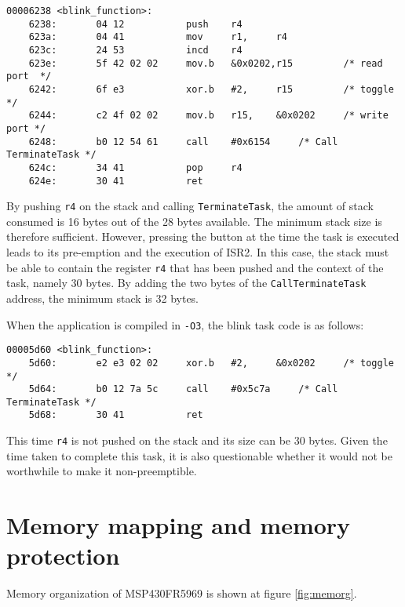 \documentclass[11pt, oneside]{article}   	%
\begin{document}
\begin{lstlisting}[basicstyle=\footnotesize\ttfamily]
00006238 <blink_function>:
    6238:       04 12           push    r4              
    623a:       04 41           mov     r1,     r4      
    623c:       24 53           incd    r4              
    623e:       5f 42 02 02     mov.b   &0x0202,r15         /* read port  */
    6242:       6f e3           xor.b   #2,     r15         /* toggle     */
    6244:       c2 4f 02 02     mov.b   r15,    &0x0202     /* write port */
    6248:       b0 12 54 61     call    #0x6154     /* Call TerminateTask */
    624c:       34 41           pop     r4              
    624e:       30 41           ret                     
\end{lstlisting}

By pushing \lstinline{r4} on the stack and calling \lstinline{TerminateTask}, the amount of stack consumed is 16 bytes out of the 28 bytes available. The minimum stack size is therefore sufficient. However, pressing the button at the time the task is executed leads to its pre-emption and the execution of ISR2. In this case, the stack must be able to contain the register \lstinline{r4} that has been pushed and the context of the task, namely 30 bytes. By adding the two bytes of the \lstinline{CallTerminateTask} address, the minimum stack is 32 bytes.

When the application is compiled in \lstinline{-O3}, the blink task code is as follows:

\begin{lstlisting}[basicstyle=\footnotesize\ttfamily]
00005d60 <blink_function>:
    5d60:       e2 e3 02 02     xor.b   #2,     &0x0202     /* toggle     */
    5d64:       b0 12 7a 5c     call    #0x5c7a     /* Call TerminateTask */ 
    5d68:       30 41           ret                     
\end{lstlisting}

This time \lstinline{r4} is not pushed on the stack and its size can be 30 bytes. Given the time taken to complete this task, it is also questionable whether it would not be worthwhile to make it non-preemptible.

\section{Memory mapping and memory protection}

Memory organization of MSP430FR5969 is shown at figure \ref{fig:memorg}. 
\end{document}
